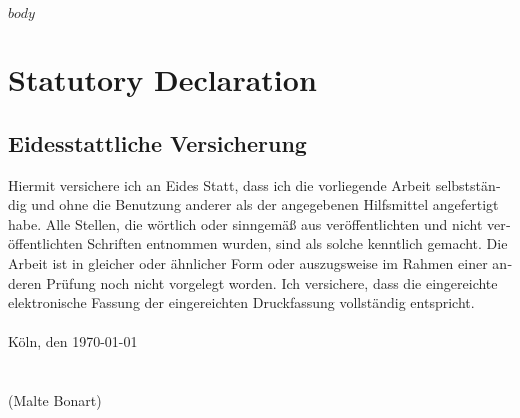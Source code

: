 \documentclass[a4paper, bibtotocnumbered,liststotoc,12pt]{scrartcl}
\theoremstyle{definition}
\theoremstyle{remark}
\numberwithin{figure}{section}
\numberwithin{table}{section}
\numberwithin{equation}{section}
\begin{document}


$body$


\newpage
\printbibliography




\newpage
\thispagestyle{plain}
\section{Statutory Declaration}


\begin{otherlanguage}{ngerman}
	
	\section*{Eidesstattliche Versicherung}
	
	 Hiermit versichere ich an Eides Statt, dass ich die vorliegende Arbeit selbstständig und ohne die Benutzung anderer als der angegebenen Hilfsmittel angefertigt habe. Alle Stellen, die wörtlich oder sinngemäß aus veröffentlichten und nicht veröffentlichten Schriften entnommen wurden, sind als solche kenntlich gemacht. Die Arbeit ist in gleicher oder ähnlicher Form oder auszugsweise im Rahmen einer anderen Prüfung noch nicht vorgelegt worden. Ich versichere, dass die eingereichte elektronische Fassung der eingereichten Druckfassung vollständig entspricht. \\
	\\
	K\"oln, den \today
	\\
	\\
	\\
	(Malte Bonart)
\end{otherlanguage}


%
%
\end{document}
